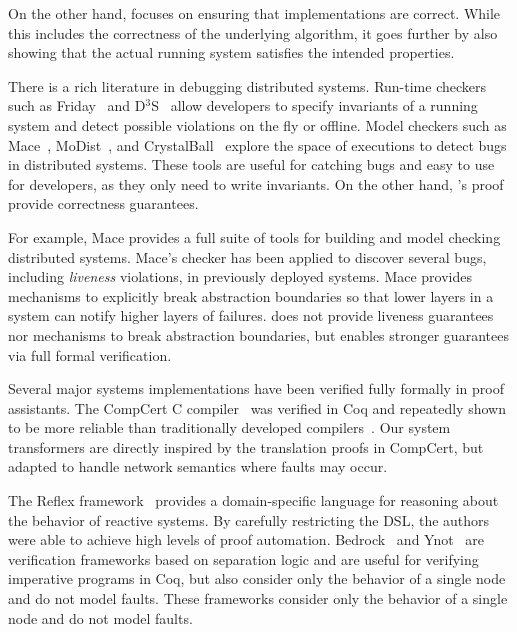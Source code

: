 On the other hand, \Verdi focuses on ensuring that implementations
are correct.  While this includes the correctness of the underlying
algorithm, it goes further by also showing that the actual running
system satisfies the intended properties.

 There is a rich literature in
debugging distributed systems.  Run-time checkers such as
Friday~\cite{geels:friday} and D$^3$S~\cite{liu:d3s} allow developers
to specify invariants of a running system and detect possible
violations on the fly or offline.  Model checkers such as
Mace~\cite{killian:mace, killian:macemc}, MoDist~\cite{yang:modist},
and CrystalBall~\cite{yabandeh:crystalball} explore the space of
executions to detect bugs in distributed systems.  These tools are
useful for catching bugs and easy to use for developers, as they only
need to write invariants.  On the other hand, \Verdi's proof provide
correctness guarantees.

For example, Mace provides a full suite of tools for building and model
checking distributed systems.  Mace's checker has been applied to discover
several bugs, including \emph{liveness} violations, in previously deployed
systems. Mace provides mechanisms to explicitly break abstraction
boundaries so that lower layers in a system can notify higher layers of
failures.  \Verdi does not provide liveness guarantees nor mechanisms to
break abstraction boundaries, but enables stronger guarantees via full
formal verification.

 Several major systems implementations have been
verified fully formally in proof assistants.  The CompCert C
compiler~\cite{leroy:compcert} was verified in
Coq and repeatedly shown to be more reliable than traditionally
developed compilers~\cite{yang:csmith,vu:emi}. Our system transformers
are directly inspired by the translation proofs in CompCert, but
adapted to handle network semantics where faults may occur.

The Reflex framework~\cite{ricketts:reflex} provides a domain-specific
language for reasoning about the behavior of reactive systems.  By
carefully restricting the DSL, the authors were able to achieve high
levels of proof automation.  Bedrock~\cite{chlipala:bedrock} and
Ynot~\cite{nanevski:ynot} are verification frameworks based on
separation logic and are useful for verifying imperative programs in
Coq, but also consider only the behavior of a single node and do not
model faults.  These frameworks consider only the behavior of a single
node and do not model faults.

